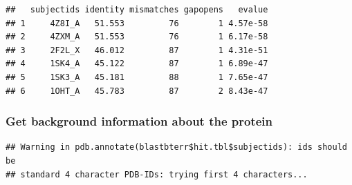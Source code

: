 \documentclass[]{article}
\newenvironment{Shaded}{\begin{snugshade}}{\end{snugshade}}
\newcommand{\KeywordTok}[1]{\textcolor[rgb]{0.13,0.29,0.53}{\textbf{#1}}}
\newcommand{\StringTok}[1]{\textcolor[rgb]{0.31,0.60,0.02}{#1}}
\newcommand{\CommentTok}[1]{\textcolor[rgb]{0.56,0.35,0.01}{\textit{#1}}}
\newcommand{\OperatorTok}[1]{\textcolor[rgb]{0.81,0.36,0.00}{\textbf{#1}}}
\newcommand{\NormalTok}[1]{#1}
\begin{document}
\begin{verbatim}
##   subjectids identity mismatches gapopens   evalue
## 1     4Z8I_A   51.553         76        1 4.57e-58
## 2     4ZXM_A   51.553         76        1 6.17e-58
## 3     2F2L_X   46.012         87        1 4.31e-51
## 4     1SK4_A   45.122         87        1 6.89e-47
## 5     1SK3_A   45.181         88        1 7.65e-47
## 6     1OHT_A   45.783         87        2 8.43e-47
\end{verbatim}

\subsubsection{Get background information about the
protein}\label{get-background-information-about-the-protein}

\begin{Shaded}
\end{Shaded}

\begin{verbatim}
## Warning in pdb.annotate(blastbterr$hit.tbl$subjectids): ids should be
## standard 4 character PDB-IDs: trying first 4 characters...
\end{verbatim}

\begin{Shaded}
\end{Shaded}

\begin{Shaded}
\end{Shaded}
\end{document}
